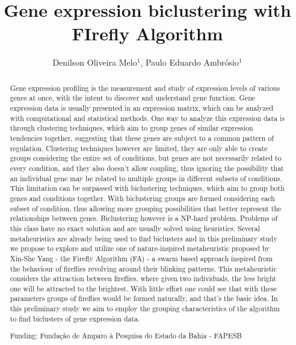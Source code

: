 \documentclass[twoside]{article}
\title{\vspace{-15mm}\fontsize{24pt}{10pt}\selectfont\textbf{Gene expression biclustering with FIrefly Algorithm}} %
\author{Denilson Oliveira Melo$^1$, Paulo Eduardo Ambr\'osio$^1$}
\affil{1 UESC\\ }
\date{}
\begin{document}
\maketitle %

\thispagestyle{fancy} %


\begin{abstract}
Gene expression profiling is the measurement and study of expression levels of various genes at once, with the intent to discover and understand gene function. Gene expression data is usually presented in an expression matrix, which can be  analyzed with computational and statistical methods. One way to analyze this expression data is through clustering techniques, which aim to group genes of similar expression tendencies together, suggesting that these genes are subject to a common pattern of regulation. Clustering techniques however are limited, they are only able to create groups considering the entire set of conditions, but genes are not necessarily related to every condition, and they also doesn't allow coupling, thus ignoring the possibility that an individual gene may be related to multiple groups in different subsets of conditions. This limitation can be surpassed with biclustering techniques, which aim to group both genes and conditions together. With biclustering groups are formed considering each subset of condition, thus allowing more grouping possibilities that better represent the relationships between genes. Biclustering however is a NP-hard problem. Problems of this class have no exact solution and are usually solved using heuristics. Several metaheuristics are already being used to find biclusters and in this preliminary study we propose to explore and utilize one of nature-inspired metaheuristic proposed by Xin-She Yang - the Firefly Algorithm (FA) - a swarm based approach inspired from the behaviour of fireflies revolving around their blinking patterns. This metaheuristic considers the attraction between fireflies, where given two individuals, the less bright one will be attracted to the brightest. With little effort one could see that with these parameters groups of fireflies would be formed naturally, and that's the basic idea. In this preliminary study we aim to employ the grouping characteristics of the algorithm to find biclusters of gene expression data.

Funding: Funda\c{c}\~ao de Amparo \`a Pesquisa do Estado da Bahia - FAPESB
\end{abstract}
\end{document}
